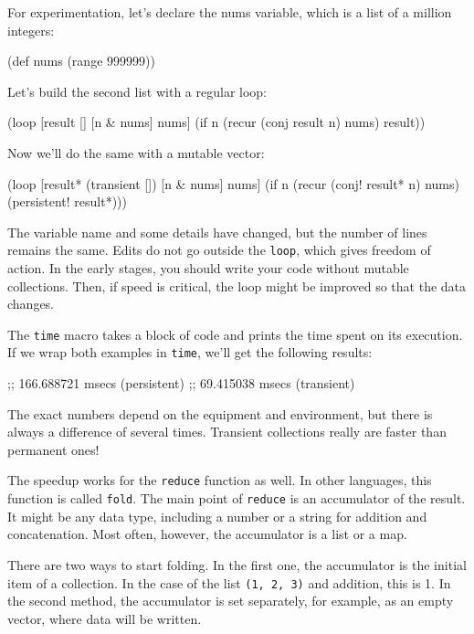 For experimentation, let's declare the nums variable, which is a list of a million integers:

\begin{clojure}
(def nums (range 999999))
\end{clojure}


\noindent
Let's build the second list with a regular loop:

\begin{clojure}
(loop [result []
       [n & nums] nums]
  (if n
    (recur (conj result n) nums)
    result))
\end{clojure}

\noindent
Now we'll do the same with a mutable vector:

\begin{clojure}
(loop [result* (transient [])
       [n & nums] nums]
  (if n
    (recur (conj! result* n) nums)
    (persistent! result*)))
\end{clojure}

The variable name and some details have changed, but the number of lines remains the same.
Edits do not go outside the \verb|loop|, which gives freedom of action.
In the early stages, you should write your code without mutable collections.
Then, if speed is critical, the loop might be improved so that the data changes.

The \verb|time| macro takes a block of code and prints the time spent on its execution.
If we wrap both examples in \verb|time|, we'll get the following results:

\begin{text}
;; 166.688721 msecs (persistent)
;;  69.415038 msecs (transient)
\end{text}

The exact numbers depend on the equipment and environment, but there is always a difference of several times. Transient collections really are faster than permanent ones!


The speedup works for the \verb|reduce| function as well. In other languages, this function is called \verb|fold|. The main point of \verb|reduce| is an accumulator of the result.
It might be any data type, including a number or a string for addition and concatenation. Most often, however, the accumulator is a list or a map.

There are two ways to start folding.
In the first one, the accumulator is the initial item of a collection. In the case of the list \verb|(1, 2, 3)| and addition, this is 1. In the second method, the accumulator is set separately, for example, as an empty vector, where data will be written.

